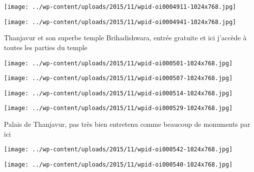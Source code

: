  \newline
\centerline{\texttt{[image: ../wp-content/uploads/2015/11/wpid-oi0004911-1024x768.jpg]} } 
 \newline
 \newline
\centerline{\texttt{[image: ../wp-content/uploads/2015/11/wpid-oi0004941-1024x768.jpg]} } 
 \newline
 Thanjavur et son superbe temple Brihadishwara, entrée gratuite et ici j'accède à toutes les parties du temple \newline
 \newline
\centerline{\texttt{[image: ../wp-content/uploads/2015/11/wpid-oi000501-1024x768.jpg]} } 
 \newline
 \newline
\centerline{\texttt{[image: ../wp-content/uploads/2015/11/wpid-oi000507-1024x768.jpg]} } 
 \newline
 \newline
\centerline{\texttt{[image: ../wp-content/uploads/2015/11/wpid-oi000514-1024x768.jpg]} } 
 \newline
 \newline
\centerline{\texttt{[image: ../wp-content/uploads/2015/11/wpid-oi000529-1024x768.jpg]} } 
 \newline
 Palais de Thanjavur, pas très bien entretenu comme beaucoup de monuments par ici \newline
 \newline
\centerline{\texttt{[image: ../wp-content/uploads/2015/11/wpid-oi000542-1024x768.jpg]} } 
 \newline
 \newline
\centerline{\texttt{[image: ../wp-content/uploads/2015/11/wpid-oi000540-1024x768.jpg]} } 
 \newline

\newpage
 
